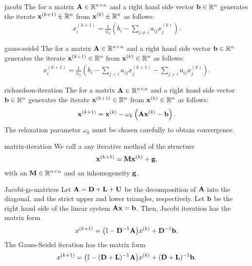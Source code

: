 
\begin{Definition}{jacobi}
  The  for a matrix $\mathbf A\in\mathbb R^{n\times n}$ and a
  right hand side vector $\mathbf b\in \mathbb R^n$ generates the iterate
  $\mathbf x^{(k+1)}\in \mathbb R^n$ from $\mathbf x^{(k)}\in \mathbb R^n$ as follows:
  \begin{gather}
     x^{(k+1)}_i = \frac1{a_{ii}}\left( b_i - \sum_{j\neq i} a_{ij}x^{(k)}_j\right).
  \end{gather}
\end{Definition}

\begin{Definition}{gauss-seidel}
  The  for a matrix $\mathbf A\in\mathbb R^{n\times n}$ and a
  right hand side vector $\mathbf b\in \mathbb R^n$ generates the iterate
  $\mathbf x^{(k+1)}\in \mathbb R^n$ from $\mathbf x^{(k)}\in \mathbb R^n$ as follows:
  \begin{gather}
    x^{(k+1)}_i = \frac1{a_{ii}}
    \left( b_i
      - \sum_{j< i} a_{ij}x^{(k+1)}_j
      - \sum_{j> i} a_{ij}x^{(k)}_j
  \right).
  \end{gather}
\end{Definition}

\begin{Definition}{richardson-iteration}
  The  for a matrix $\mathbf A\in\mathbb R^{n\times n}$ and a
  right hand side vector $\mathbf b\in \mathbb R^n$ generates the iterate
  $\mathbf x^{(k+1)}\in \mathbb R^n$ from $\mathbf x^{(k)}\in \mathbb R^n$ as follows:
  \begin{gather}
    \mathbf x^{(k+1)} = \mathbf x^{(k)} - 
    \omega_k\left( \mathbf A\mathbf x^{(k)} - \mathbf b
  \right).
\end{gather}
The relaxation parameter $\omega_k$ must be chosen carefully to obtain
convergence.
\end{Definition}

\begin{Definition}{matrix-iteration}
  We call a  any iterative method of the structure
  \begin{gather}
    \mathbf x^{(k+1)} = \mathbf M \mathbf x^{(k)} + \mathbf g,
  \end{gather}
  with an  $\mathbf M\in\mathbb R^{n\times n}$ and an inhomogeneity $\mathbf g$.
\end{Definition}

\begin{Lemma}{Jacobi-gs-matrices}
  Let $\mathbf A = \mathbf D +\mathbf L+\mathbf U$ be the decomposition of $\mathbf A$
  into the diagonal, and the strict upper and lower triangles,
  respectively. Let $\mathbf b$ be the right hand side of the linear system
  $\mathbf A\mathbf x=\mathbf b$. Then, Jacobi iteration has the matrix form
  \begin{gather}
    x^{(k+1)} = \bigl(\mathbb I-\mathbf D^{-1}\mathbf A\bigr) x^{(k)} + \mathbf D^{-1} \mathbf b.
  \end{gather}
  The Gauss-Seidel iteration has the matrix form
  \begin{gather}
    x^{(k+1)} = \bigl(\mathbb I-(\mathbf D+\mathbf L)^{-1}\mathbf A\bigr) x^{(k)} + (\mathbf D+\mathbf L)^{-1} \mathbf b.
  \end{gather}
\end{Lemma}

